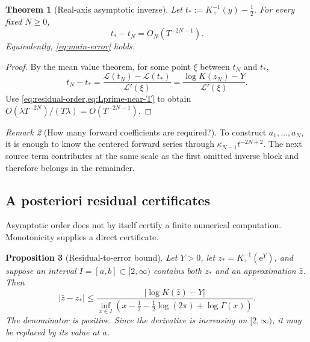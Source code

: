 \documentclass[11pt,oneside]{article}
\theoremstyle{plain}
\newtheorem{theorem}{Theorem}[section]
\newtheorem{proposition}[theorem]{Proposition}
\theoremstyle{definition}
\theoremstyle{remark}
\newtheorem{remark}[theorem]{Remark}
\newcommand{\e}{\mathrm{e}}
\newcommand{\Lcal}{\mathcal{L}}
\begin{document}
\begin{theorem}[Real-axis asymptotic inverse]
\label{thm:real-asymptotic}
Let \(t_*:=K_+^{-1}(y)-\tfrac12\).  For every fixed \(N\ge0\),
\begin{equation}
 t_*-t_N=O_N(T^{-2N-1}).
 \label{eq:t-error}
\end{equation}
Equivalently, \cref{eq:main-error} holds.
\end{theorem}

\begin{proof}
By the mean value theorem, for some point \(\xi\) between \(t_N\) and \(t_*\),
\begin{equation}
 t_N-t_*
 =\frac{\Lcal(t_N)-\Lcal(t_*)}{\Lcal'(\xi)}
 =\frac{\log K(z_N)-Y}{\Lcal'(\xi)}.
 \label{eq:MVT-transfer}
\end{equation}
Use \cref{eq:residual-order,eq:Lprime-near-T} to obtain
\(O(\lambda T^{-2N})/(T\lambda)=O(T^{-2N-1})\).
\end{proof}

\begin{remark}[How many forward coefficients are required?]
To construct \(a_1,\ldots,a_N\), it is enough to know the centered forward
series through \(\kappa_{N-1}t^{-2N+2}\).  The next source term contributes at
the same scale as the first omitted inverse block and therefore belongs in the
remainder.
\end{remark}

\subsection{A posteriori residual certificates}

Asymptotic order does not by itself certify a finite numerical computation.
Monotonicity supplies a direct certificate.

\begin{proposition}[Residual-to-error bound]
\label{prop:residual-certificate}
Let \(Y>0\), let \(z_*=K_+^{-1}(\e^Y)\), and suppose an interval
\(I=[a,b]\subset[2,\infty)\) contains both \(z_*\) and an approximation
\(\widehat z\).  Then
\begin{equation}
 |\widehat z-z_*|
 \le
 \frac{|\log K(\widehat z)-Y|}
      {\inf_{x\in I}\left(x-\frac12-\frac12\log(2\pi)+\log\Gamma(x)\right)}.
 \label{eq:residual-certificate}
\end{equation}
The denominator is positive.  Since the derivative is increasing on
\([2,\infty)\), it may be replaced by its value at \(a\).
\end{proposition}
\end{document}
